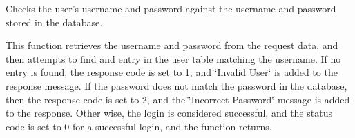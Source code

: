 \-Checks the user's username and password against the username and password stored in the database. 

\-This function retrieves the username and password from the request data, and then attempts to find and entry in the user table matching the username. \-If no entry is found, the response code is set to 1, and \char`\"{}\-Invalid User\char`\"{} is added to the response message. \-If the password does not match the password in the database, then the response code is set to 2, and the \char`\"{}\-Incorrect Password\char`\"{} message is added to the response. \-Other wise, the login is considered successful, and the status code is set to 0 for a successful login, and the function returns. 